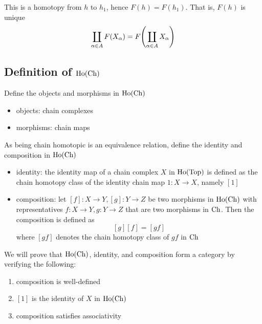 \documentclass{article}
\begin{document}
This is a homotopy from $h$ to $h_1$, hence $F(h) = F(h_1)$. That is, $F(h)$ is unique
$$
    \coprod_{\alpha \in A} F(X_\alpha) = F \tuple*{\coprod_{\alpha \in A} X_\alpha}
$$

\subsection{Definition of $\operatorname{Ho}(\operatorname{Ch})$}

Define the objects and morphisms in $\operatorname{Ho}(\operatorname{Ch})$
\begin{itemize}
    \item objects: chain complexes
    \item morphisms: chain maps
\end{itemize}

As being chain homotopic is an equivalence relation, define the identity and composition in $\operatorname{Ho}(\operatorname{Ch})$
\begin{itemize}
    \item identity: the identity map of a chain complex $X$ in $\operatorname{Ho}(\operatorname{Top})$ is defined as the chain homotopy class of the identity chain map $1: X \to X$, namely $[1]$
    \item composition: let $[f]: X \to Y, [g]: Y \to Z$ be two morphisms in $\operatorname{Ho}(\operatorname{Ch})$ with representatives $f: X \to Y, g: Y \to Z$ that are two morphisms in $\operatorname{Ch}$. Then the composition is defined as
    $$
        [g][f] = [gf]
    $$
    where $[gf]$ denotes the chain homotopy class of $gf$ in $\operatorname{Ch}$ 
\end{itemize}

We will prove that $\operatorname{Ho}(\operatorname{Ch})$, identity, and composition form a category by verifying the following:
\begin{enumerate}
    \item composition is well-defined
    \item $[1]$ is the identity of $X$ in $\operatorname{Ho}(\operatorname{Ch})$
    \item composition satisfies associativity
\end{enumerate}
\end{document}
